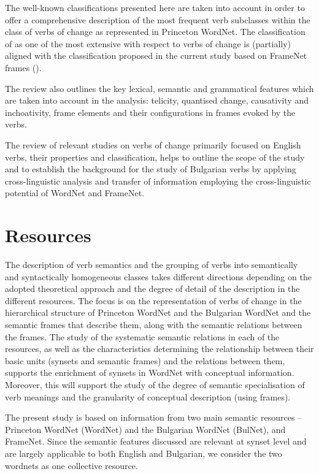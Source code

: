 \documentclass[output=paper,colorlinks,citecolor=brown]{langscibook}
\begin{document}
The well-known classifications presented here are taken into account in order to offer a comprehensive description of the most frequent verb subclasses within the class of verbs of change as represented in Princeton WordNet. The classification of \citet{Levin1993} as one of the most extensive with respect to verbs of change is (partially) aligned with the classification proposed in the current study based on FrameNet frames ().

The review also outlines the key lexical, semantic and grammatical features which are taken into account in the analysis: telicity, quantised change, causativity and inchoativity, frame elements and their configurations in frames evoked by the verbs.

The review of relevant studies on verbs of change primarily focused on English verbs, their properties and classification, helps to outline the scope of the study and to establish the background for the study of Bulgarian verbs by applying cross-linguistic analysis and transfer of information employing the cross-linguistic potential of WordNet and FrameNet.

\section{Resources}\label{ch3:sec:resources}
\largerpage
The description of verb semantics and the grouping of verbs into semantically and syntactically homogeneous classes takes different directions depending on the adopted theoretical approach and the degree of detail of the description in the different resources.
The focus is on the representation of verbs of change in the hierarchical structure of Princeton WordNet and the Bulgarian WordNet and the semantic frames that describe them, along with the semantic relations between the frames. The study of the systematic semantic relations in each of the resources, as well as the characteristics determining the relationship between their basic units (synsets and semantic frames) and the relations between them, supports the enrichment of synsets in WordNet with conceptual information. Moreover, this will support the study of the degree of semantic specialisation of verb meanings and the granularity of conceptual description (using frames).

The present study is based on information from two main semantic resources -- Princeton WordNet (WordNet) and the Bulgarian WordNet (BulNet), and FrameNet. Since the semantic features discussed are relevant at synset level and are largely applicable to both English and Bulgarian, we consider the two wordnets as one collective resource.
\end{document}
